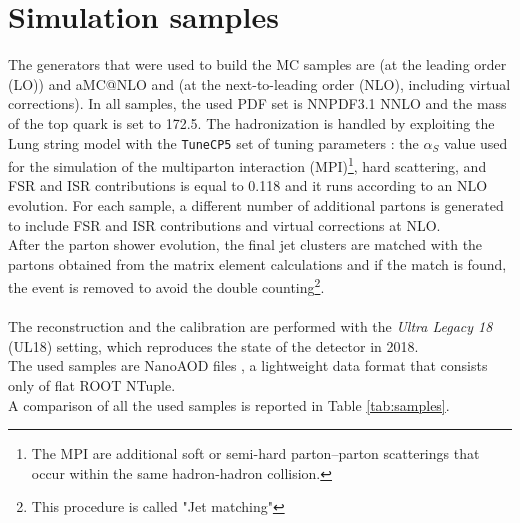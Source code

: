 \section{Simulation samples}
The generators that were used to build the MC samples are  (at the leading order (LO)) and aMC@NLO and  (at the next-to-leading order (NLO), including virtual corrections). In all samples, the used PDF set is NNPDF3.1 NNLO and the mass of the top quark is set to 172.5\GeV. The hadronization is handled by  exploiting the Lung string model with the \texttt{TuneCP5} set of tuning parameters \cite{Sirunyan2020ExtractionMeasurements}: the $\alpha_S$ value used for the simulation of the multiparton interaction (MPI)\footnote{The MPI are additional soft or semi-hard parton–parton scatterings that occur within the same hadron-hadron collision.}, hard scattering, and FSR and ISR contributions is equal to 0.118 and it runs according to an NLO evolution.
For each sample, a different number of additional partons is generated to include FSR and ISR contributions and virtual corrections at NLO.
\\
After the parton shower evolution, the final jet clusters are matched with the partons obtained from the matrix element calculations and if the match is found, the event is removed to avoid the double counting\footnote{This procedure is called "Jet matching"}.
\\
\\
The reconstruction and the calibration are performed with the \textit{Ultra Legacy 18} (UL18) setting, which reproduces the state of the detector in 2018.\\
The used samples are NanoAOD files \cite{Liu2020TheCMS}, a lightweight data format that consists only of flat ROOT NTuple.
\\
A comparison of all the used samples is reported in Table \ref{tab:samples}.
